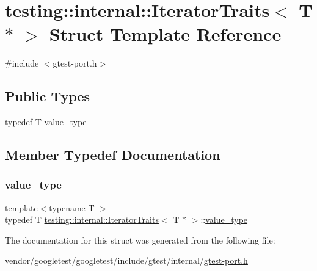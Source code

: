 \hypertarget{structtesting_1_1internal_1_1_iterator_traits_3_01_t_01_5_01_4}{}\section{testing\+:\+:internal\+:\+:Iterator\+Traits$<$ T $\ast$ $>$ Struct Template Reference}
\label{structtesting_1_1internal_1_1_iterator_traits_3_01_t_01_5_01_4}


{\ttfamily \#include $<$gtest-\/port.\+h$>$}

\subsection*{Public Types}
\begin{DoxyCompactItemize}
\item 
typedef T \hyperlink{structtesting_1_1internal_1_1_iterator_traits_3_01_t_01_5_01_4_a7e46869ed36cc5aea898e243d270a8be}{value\+\_\+type}
\end{DoxyCompactItemize}


\subsection{Member Typedef Documentation}
\mbox{\label{structtesting_1_1internal_1_1_iterator_traits_3_01_t_01_5_01_4_a7e46869ed36cc5aea898e243d270a8be}} 
\subsubsection{\texorpdfstring{value\+\_\+type}{value\_type}}
{\footnotesize\ttfamily template$<$typename T $>$ \\
typedef T \hyperlink{structtesting_1_1internal_1_1_iterator_traits}{testing\+::internal\+::\+Iterator\+Traits}$<$ T $\ast$ $>$\+::\hyperlink{structtesting_1_1internal_1_1_iterator_traits_3_01_t_01_5_01_4_a7e46869ed36cc5aea898e243d270a8be}{value\+\_\+type}}



The documentation for this struct was generated from the following file\+:\begin{DoxyCompactItemize}
\item 
vendor/googletest/googletest/include/gtest/internal/\hyperlink{gtest-port_8h}{gtest-\/port.\+h}\end{DoxyCompactItemize}
